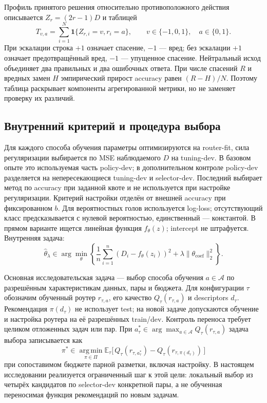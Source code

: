 Профиль принятого решения относительно противоположного действия
описывается $Z_r=(2r-1)D$ и таблицей
\begin{equation}
 T_{v,a}=\sum_{i=1}^{N}\mathbf1\{Z_{r,i}=v,r_i=a\},
 \qquad v\in\{-1,0,1\},\quad a\in\{0,1\}.
\end{equation}
При эскалации строка $+1$ означает спасение, $-1$ --- вред;
без эскалации $+1$ означает предотвращённый вред, $-1$ --- упущенное
спасение. Нейтральный исход объединяет два правильных и два ошибочных
ответа. При числе спасений $R$ и вредных замен $H$ эмпирический прирост
accuracy равен $(R-H)/N$. Поэтому таблица раскрывает компоненты
агрегированной метрики, но не заменяет проверку их различий.

\subsection{Внутренний критерий и процедура выбора}
Для каждого способа обучения параметры оптимизируются на router-fit,
сила регуляризации выбирается по MSE наблюдаемого $D$ на tuning-dev.
В базовом опыте это используемая часть policy-dev; в дополнительном
контроле policy-dev разделяется на непересекающиеся tuning-dev
и selector-dev. Последний выбирает метод по accuracy при заданной квоте
и не используется при настройке регуляризации.
Критерий настройки отделён от внешней accuracy при фиксированном $b$.
Для вероятностных голов используется log-loss; отсутствующий класс
предсказывается с нулевой вероятностью, единственный --- константой.
В прямом варианте ищется линейная функция $f_\theta(z)$; intercept
не штрафуется. Внутренняя задача:
\begin{equation}\label{eq:argmin}
\widehat\theta_\lambda\in\arg\min_\theta
\left\lbrace
\frac1n\sum_{i=1}^{n}(D_i-f_\theta(z_i))^2+
\lambda\|\theta_{\mathrm{coef}}\|_2^2
\right\rbrace.
\end{equation}

Основная исследовательская задача --- выбор способа обучения
$a\in\mathcal A$ по разрешённым характеристикам данных, пары и бюджета.
Для конфигурации $\tau$ обозначим обученный роутер $r_{\tau,a}$,
его качество $Q_\tau(r_{\tau,a})$ и descriptors $d_\tau$.
Рекомендация $\pi(d_\tau)$ не использует test; на новой задаче допускаются
обучение и настройка роутера на её разрешённых train/dev. Контроль
переноса требует целиком отложенных задач или пар. При
$a_\tau^*\in\arg\max_{a\in\mathcal A}Q_\tau(r_{\tau,a})$
задача выбора записывается как
\begin{equation}\label{eq:selection}
\pi^* \in \mathop{\mathrm{arg\,min}}\limits_{\pi\in\Pi}
\mathbb{E}_\tau
\bigl[\,Q_\tau(r_{\tau,a_\tau^*})-
Q_\tau(r_{\tau,\pi(d_\tau)})\,\bigr]
\end{equation}
при сопоставимом бюджете парной разметки, включая настройку.
В настоящем исследовании реализуется ограниченный шаг к этой цели:
локальный выбор из четырёх кандидатов по selector-dev конкретной пары,
а не обученная переносимая функция рекомендаций по новым задачам.
